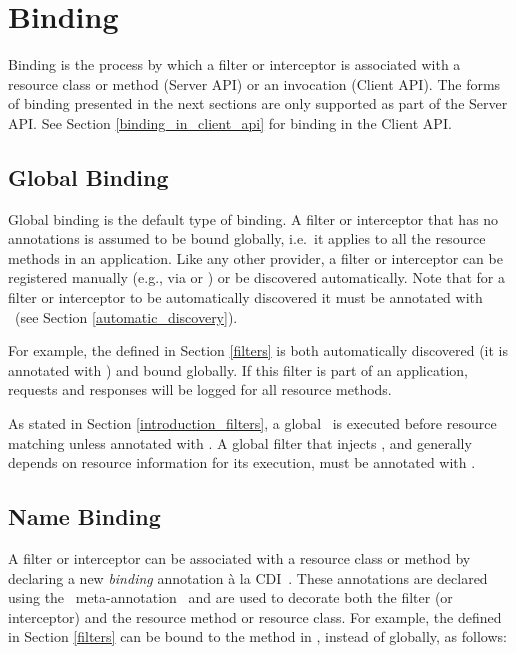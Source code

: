 \section{Binding}

Binding is the process by which a filter or interceptor is associated with a resource class or method (Server API) or an invocation (Client API). The forms of binding presented in the next sections are only supported as part of the Server API. See Section \ref{binding_in_client_api} for binding in the Client API.

\subsection{Global Binding}
\label{global_binding}

Global binding is the default type of binding. A filter or interceptor that has no annotations is assumed to be bound globally, i.e.~it applies to all the resource methods in an application. Like any other provider, a filter or interceptor can be registered manually (e.g., via  or ) or be discovered automatically. Note that for a filter or interceptor to be automatically discovered it must be annotated with \Provider\ (see Section \ref{automatic_discovery}). 

For example, the  defined in Section \ref{filters} is both automatically discovered (it is annotated with \Provider) and bound globally. If this filter is part of an application, requests and responses will be logged for all resource methods. 

As stated in Section \ref{introduction_filters}, a global \ContainerRequestFilter\ is executed before resource matching unless annotated with \PostMatching. A global filter that injects , and generally depends on resource information for its execution, must be annotated with \PostMatching.

\subsection{Name Binding}
\label{Name_Binding}

A filter or interceptor can be associated with a resource class or method by declaring a new \emph{binding} annotation \`{a} la CDI~\cite{jsr299}. These annotations are declared using the \jaxrs\ meta-annotation \NameBinding\ and are used to decorate both the filter (or interceptor) and the resource method or resource class. For example, the  defined in Section \ref{filters} can be bound to the method  in , instead of globally, as follows:


